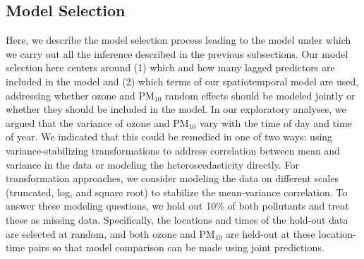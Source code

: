 \documentclass[alpha-refs]{wiley-article}
\begin{document}
\subsection{Model Selection}\label{sec:mod_comp}

Here, we describe the model selection process leading to the model under which we carry out all the inference described in the previous subsections. Our model selection here centers around (1) which and how many lagged predictors are included in the model and (2) which terms of our spatiotemporal model are used, addressing whether ozone and $\text{PM}_{10}$ random effects should be modeled jointly or whether they should be included in the model. In our exploratory analyses, we argued that the variance of ozone and $\text{PM}_{10}$ vary with the time of day and time of year. We indicated that this could be remedied in one of two ways: using variance-stabilizing transformations to address correlation between mean and variance in the data or modeling the heteroscedasticity directly. For transformation approaches, we consider modeling the data on different scales (truncated, log, and square root) to stabilize the mean-variance correlation. To answer these modeling questions, we hold out 10\% of both pollutants and treat these as missing data. Specifically, the locations and times of the hold-out data are selected at random, and both ozone and $\text{PM}_{10}$ are held-out at these location-time pairs so that model comparison can be made using joint predictions. 
\end{document}
